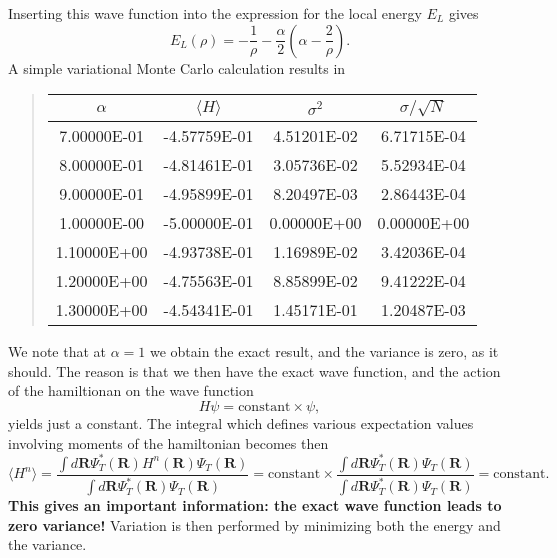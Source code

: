 Inserting this wave function into the expression for the
local energy $E_L$ gives
\[
   E_L(\rho)=-\frac{1}{\rho}-
              \frac{\alpha}{2}\left(\alpha-\frac{2}{\rho}\right).
\]
A simple variational Monte Carlo calculation results in

\begin{quote}
\begin{tabular}{cccc}
\hline
\multicolumn{1}{c}{ $\alpha$ } & \multicolumn{1}{c}{ $\langle H \rangle $ } & \multicolumn{1}{c}{ $\sigma^2$ } & \multicolumn{1}{c}{ $\sigma/\sqrt{N}$ } \\
\hline
7.00000E-01 & -4.57759E-01         & 4.51201E-02 & 6.71715E-04       \\
8.00000E-01 & -4.81461E-01         & 3.05736E-02 & 5.52934E-04       \\
9.00000E-01 & -4.95899E-01         & 8.20497E-03 & 2.86443E-04       \\
1.00000E-00 & -5.00000E-01         & 0.00000E+00 & 0.00000E+00       \\
1.10000E+00 & -4.93738E-01         & 1.16989E-02 & 3.42036E-04       \\
1.20000E+00 & -4.75563E-01         & 8.85899E-02 & 9.41222E-04       \\
1.30000E+00 & -4.54341E-01         & 1.45171E-01 & 1.20487E-03       \\
\hline
\end{tabular}
\end{quote}

\noindent
We note that at $\alpha=1$ we obtain the exact
result, and the variance is zero, as it should. The reason is that 
we then have the exact wave function, and the action of the hamiltionan
on the wave function
\[
   H\psi = \mathrm{constant}\times \psi,
\]
yields just a constant. The integral which defines various 
expectation values involving moments of the hamiltonian becomes then
\[
   \langle H^n \rangle =
   \frac{\int d\bm{R}\Psi^{\ast}_T(\bm{R})H^n(\bm{R})\Psi_T(\bm{R})}
        {\int d\bm{R}\Psi^{\ast}_T(\bm{R})\Psi_T(\bm{R})}=
\mathrm{constant}\times\frac{\int d\bm{R}\Psi^{\ast}_T(\bm{R})\Psi_T(\bm{R})}
        {\int d\bm{R}\Psi^{\ast}_T(\bm{R})\Psi_T(\bm{R})}=\mathrm{constant}.
\]
\textbf{This gives an important information: the exact wave function leads to zero variance!}
Variation is then performed by minimizing both the energy and the variance.

